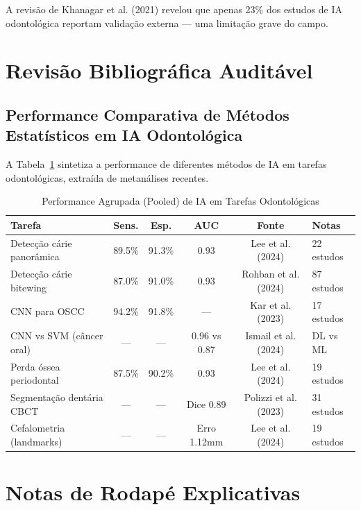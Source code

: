 A revisão de Khanagar et al. (2021) \cite{ODT-001} revelou que apenas 23\% dos estudos de IA odontológica reportam validação externa — uma limitação grave do campo.

\section{Revisão Bibliográfica Auditável}

\subsection{Performance Comparativa de Métodos Estatísticos em IA Odontológica}

A Tabela~\ref{tab:performance-estatistica} sintetiza a performance de diferentes métodos de IA em tarefas odontológicas, extraída de metanálises recentes.

\begin{table}[H]
  \centering
  \caption{Performance Agrupada (Pooled) de IA em Tarefas Odontológicas}
  \label{tab:performance-estatistica}
  \small
  \begin{tabularx}{\textwidth}{p{3cm}ccccX}
    \toprule
    \textbf{Tarefa} & \textbf{Sens.} & \textbf{Esp.} & \textbf{AUC} & \textbf{Fonte} & \textbf{Notas} \\
    \midrule
    Detecção cárie panorâmica & 89.5\% & 91.3\% & 0.93 & Lee et al. (2024) \cite{ODT-016} & 22 estudos \\
    Detecção cárie bitewing & 87.0\% & 91.0\% & 0.93 & Rohban et al. (2024) \cite{DL-ODT-004} & 87 estudos \\
    CNN para OSCC & 94.2\% & 91.8\% & — & Kar et al. (2023) \cite{ODT-010} & 17 estudos \\
    CNN vs SVM (câncer oral) & — & — & 0.96 vs 0.87 & Ismail et al. (2024) \cite{ODT-023} & DL vs ML \\
    Perda óssea periodontal & 87.5\% & 90.2\% & 0.93 & Lee et al. (2024) \cite{ODT-038} & 19 estudos \\
    Segmentação dentária CBCT & — & — & Dice 0.89 & Polizzi et al. (2023) \cite{ODT-036} & 31 estudos \\
    Cefalometria (landmarks) & — & — & Erro 1.12mm & Lee et al. (2024) \cite{ODT-049} & 19 estudos \\
    \bottomrule
  \end{tabularx}
\end{table}

\section{Notas de Rodapé Explicativas}

